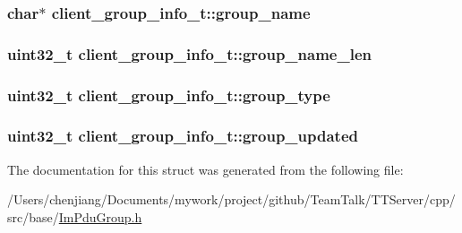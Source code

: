 \subsubsection[{group\+\_\+name}]{\setlength{\rightskip}{0pt plus 5cm}char$\ast$ client\+\_\+group\+\_\+info\+\_\+t\+::group\+\_\+name}\label{structclient__group__info__t_a8d67517e0bf6dea1c802718cdbce7553}
\hypertarget{structclient__group__info__t_aedf6577ceb273430fc1d47a74e1af812}{}
\subsubsection[{group\+\_\+name\+\_\+len}]{\setlength{\rightskip}{0pt plus 5cm}uint32\+\_\+t client\+\_\+group\+\_\+info\+\_\+t\+::group\+\_\+name\+\_\+len}\label{structclient__group__info__t_aedf6577ceb273430fc1d47a74e1af812}
\hypertarget{structclient__group__info__t_a7693ff5282e962e4631c82d7a74e7dff}{}
\subsubsection[{group\+\_\+type}]{\setlength{\rightskip}{0pt plus 5cm}uint32\+\_\+t client\+\_\+group\+\_\+info\+\_\+t\+::group\+\_\+type}\label{structclient__group__info__t_a7693ff5282e962e4631c82d7a74e7dff}
\hypertarget{structclient__group__info__t_aff62edcbdde943ce716c870304d3325b}{}
\subsubsection[{group\+\_\+updated}]{\setlength{\rightskip}{0pt plus 5cm}uint32\+\_\+t client\+\_\+group\+\_\+info\+\_\+t\+::group\+\_\+updated}\label{structclient__group__info__t_aff62edcbdde943ce716c870304d3325b}


The documentation for this struct was generated from the following file\+:\begin{DoxyCompactItemize}
\item 
/\+Users/chenjiang/\+Documents/mywork/project/github/\+Team\+Talk/\+T\+T\+Server/cpp/src/base/\hyperlink{_im_pdu_group_8h}{Im\+Pdu\+Group.\+h}\end{DoxyCompactItemize}
